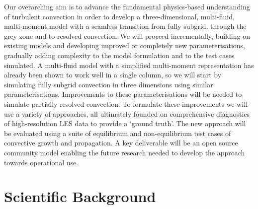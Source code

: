 \documentclass[11pt,a4paper]{article}
\begin{document}
Our overarching aim is to advance the fundamental physics-based understanding of turbulent convection in order to develop a three-dimensional, multi-fluid, multi-moment model with a seamless transition from fully subgrid, through the grey zone and to resolved convection. We will proceed incrementally, building on existing models and developing improved or completely new parameterisations, gradually adding complexity to the model formulation and to the test cases simulated.
A multi-fluid model with a simplified multi-moment representation has already been shown to work well in a single column, so we will start by simulating fully subgrid convection in three dimensions using similar parameterisations. Improvements to these parameterisations will be needed to simulate partially resolved convection. To formulate these improvements we will use a variety of approaches, all ultimately founded on comprehensive diagnostics of high-resolution LES data to provide a `ground truth'.
The new approach will be evaluated using a suite of equilibrium and non-equilibrium test cases of convective growth and propagation. A key deliverable will be an open source community model enabling the future research needed to develop the approach towards operational use.




\section{Scientific Background}
\end{document}
